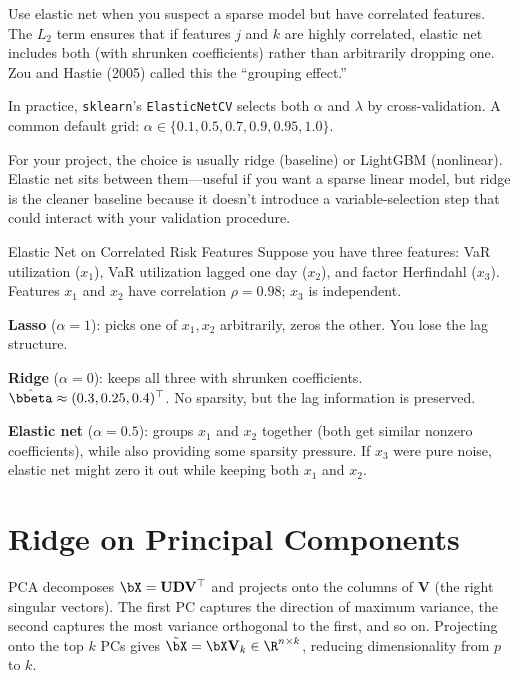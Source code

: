 \begin{keyidea}
Use elastic net when you suspect a sparse model but have correlated features.
The $L_2$ term ensures that if features $j$ and $k$ are highly correlated, elastic net includes both (with shrunken coefficients) rather than arbitrarily dropping one.
Zou and Hastie (2005) called this the ``grouping effect.''

In practice, \texttt{sklearn}'s \texttt{ElasticNetCV} selects both $\alpha$ and $\lambda$ by cross-validation.
A common default grid: $\alpha \in \{0.1, 0.5, 0.7, 0.9, 0.95, 1.0\}$.
\end{keyidea}

For your project, the choice is usually ridge (baseline) or LightGBM (nonlinear).
Elastic net sits between them---useful if you want a sparse linear model, but ridge is the cleaner baseline because it doesn't introduce a variable-selection step that could interact with your validation procedure.

\begin{workedexample}{Elastic Net on Correlated Risk Features}
Suppose you have three features: VaR utilization ($x_1$), VaR utilization lagged one day ($x_2$), and factor Herfindahl ($x_3$).
Features $x_1$ and $x_2$ have correlation $\rho = 0.98$; $x_3$ is independent.

\textbf{Lasso} ($\alpha = 1$): picks one of $x_1, x_2$ arbitrarily, zeros the other. You lose the lag structure.

\textbf{Ridge} ($\alpha = 0$): keeps all three with shrunken coefficients.
$\hat{\bbeta} \approx (0.3, 0.25, 0.4)^\top$.
No sparsity, but the lag information is preserved.

\textbf{Elastic net} ($\alpha = 0.5$): groups $x_1$ and $x_2$ together (both get similar nonzero coefficients), while also providing some sparsity pressure.
If $x_3$ were pure noise, elastic net might zero it out while keeping both $x_1$ and $x_2$.
\end{workedexample}

\section{Ridge on Principal Components}
\label{sec:ridge-pca}

\begin{prereq}
PCA decomposes $\bX = \mathbf{U}\mathbf{D}\mathbf{V}^\top$ and projects onto the columns of $\mathbf{V}$ (the right singular vectors).
The first PC captures the direction of maximum variance, the second captures the most variance orthogonal to the first, and so on.
Projecting onto the top $k$ PCs gives $\tilde{\bX} = \bX \mathbf{V}_k \in \R^{n \times k}$, reducing dimensionality from $p$ to $k$.
\end{prereq}

